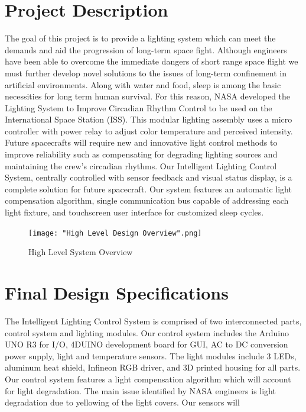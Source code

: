 \documentclass[12pt,a4paper]{report}
\begin{document}
\section{Project Description}
The goal of this project is to provide a lighting system which can meet the demands and aid the progression of long-term space fight. Although engineers have been able to overcome the immediate dangers of short range space flight we must further develop novel solutions to the issues of long-term confinement in artificial environments. Along with water and food, sleep is among the basic necessities for long term human survival. For this reason, NASA developed the Lighting System to Improve Circadian Rhythm Control to be used on the International Space Station (ISS). \cite{nasapatent} This modular lighting assembly uses a micro controller with power relay to adjust color temperature and perceived intensity.\\\linebreak
Future spacecrafts will require new and innovative light control methods to improve reliability such as compensating for degrading lighting sources and maintaining the crew's circadian rhythms. Our Intelligent Lighting Control System, centrally controlled with sensor feedback and visual status display, is a complete solution for future spacecraft. Our system features an automatic light compensation algorithm, single communication bus capable of addressing each light fixture, and touchscreen user interface for customized sleep cycles. 



\begin{figure}[H]
	\centering
	\texttt{[image: "High Level Design Overview".png]}\par\vspace{0.1cm}
	\caption{High Level System Overview}
\end{figure}

\section{Final Design Specifications}

The Intelligent Lighting Control System is comprised of two interconnected parts, control system and lighting modules. Our control system includes the Arduino UNO R3 for I/O, 4DUINO development board for GUI, AC to DC conversion power supply, light and temperature sensors. The light modules include 3 LEDs, aluminum heat shield, Infineon RGB driver, and 3D printed housing for all parts.\\
Our control system features a light compensation algorithm which will account for light degradation. The main issue identified by NASA engineers is light degradation due to yellowing of the light covers. Our sensors will 
\end{document}
